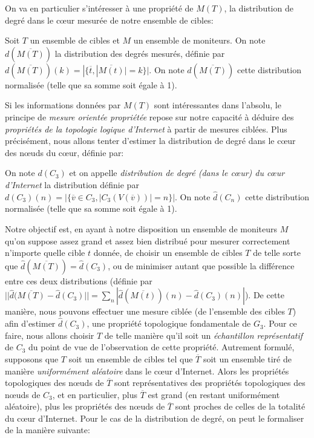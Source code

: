 On va en particulier s'intéresser à une propriété de $M(T)$, la distribution de
degré dans le cœur mesurée de notre ensemble de cibles:

\begin{definition}
Soit $T$ un ensemble de cibles et $M$ un ensemble de moniteurs. On note
$d(\overline{M(T)})$ la distribution des degrés mesurés, définie par
$d(\overline{M(T)})(k) = |\{ \overline{t}, |\overline{M(t)}| = k \}|$. On note
$\hat{d}(\overline{M(T)})$ cette distribution normalisée (telle que sa somme
soit égale à 1).
\end{definition}

Si les informations données par $M(T)$ sont intéressantes dans l'absolu, le
principe de {\em mesure orientée propriétée} repose sur notre capacité à déduire
des {\em propriétés de la topologie logique d'Internet} à partir de mesures
ciblées. Plus précisément, nous allons tenter d'estimer la distribution de degré
dans le cœur des n\oe{}uds du cœur, définie par:

\begin{definition}
On note $d(C_3)$ et on appelle {\em distribution de degré (dans le cœur) du
cœur d'Internet} la distribution définie par $d(C_3)(n) = |\{ \overline{v}
\in C_3, |C_3(V(\overline{v}))| = n \}|$. On note $\hat{d}(C_n)$ cette
distribution normalisée (telle que sa somme soit égale à 1).
\end{definition}

Notre objectif est, en ayant à notre disposition un ensemble de moniteurs $M$
qu'on suppose assez grand et assez bien distribué pour mesurer correctement
n'importe quelle cible $t$ donnée, de choisir un ensemble de cibles $T$ de telle
sorte que $\hat{d}(\overline{M(T)}) = \hat{d}(C_3)$, ou de minimiser autant que
possible la différence entre ces deux distributions (définie par $||
\hat{d}(\overline{M(T)} - \hat{d}(C_3)|| = \sum_{n}
|\hat{d}(\overline{M(t)})(n) - \hat{d}(C_3)(n)|$).
De cette manière, nous pouvons effectuer une mesure ciblée (de l'ensemble des
cibles $T$) afin d'estimer $\hat{d}(C_3)$, une propriété topologique
fondamentale de $G_3$. Pour ce faire, nous allons choisir $T$ de telle manière
qu'il soit un {\em échantillon représentatif} de $C_3$ du point de vue de
l'observation de cette propriété. Autrement formulé, supposons que $T$ soit un
ensemble de cibles tel que $\overline{T}$ soit un ensemble tiré de manière {\em
uniformément aléatoire} dans le cœur d'Internet. Alors les propriétés
topologiques des n\oe{}uds de $\overline{T}$ sont représentatives des propriétés
topologiques des n\oe{}uds de $C_3$, et en particulier, plus $\overline{T}$ est
grand (en restant uniformément aléatoire), plus les propriétés des n\oe{}uds de
$\overline{T}$ sont proches de celles de la totalité du cœur d'Internet. Pour le
cas de la distribution de degré, on peut le formaliser de la manière suivante:

